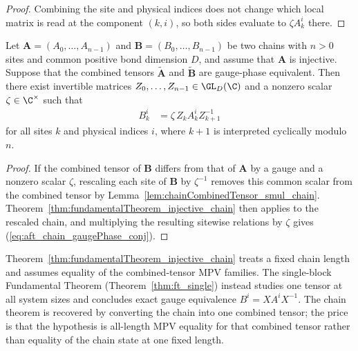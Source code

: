 \begin{proof}
    \leanok
    Combining the site and physical indices does not change which local matrix
    is read at the component $(k,i)$, so both sides evaluate to
    $\zeta A_k^i$ there.
\end{proof}

\begin{corollary}%
    \label{thm:fundamentalTheorem_injective_chain_gaugePhase}
    \leanok
    Let $\mathbf{A} = (A_0, \ldots, A_{n-1})$ and
    $\mathbf{B} = (B_0, \ldots, B_{n-1})$ be two chains with $n>0$ sites and
    common positive bond dimension $D$, and assume that $\mathbf{A}$ is
    injective.
    Suppose that the combined tensors $\widetilde{\mathbf{A}}$ and
    $\widetilde{\mathbf{B}}$ are gauge-phase equivalent.
    Then there exist invertible matrices $Z_0, \ldots, Z_{n-1} \in \GL_D(\C)$
    and a nonzero scalar $\zeta \in \C^{\times}$ such that
    \begin{align}
        B_k^i
         & =\zeta\,Z_k A_k^i Z_{k+1}^{-1}
        \label{eq:aft_chain_gaugePhase_conj}
    \end{align}
    for all sites $k$ and physical indices $i$, where $k+1$ is interpreted
    cyclically modulo $n$.
\end{corollary}

\begin{proof}
    \leanok
    If the combined tensor of $\mathbf{B}$ differs from that of $\mathbf{A}$
    by a gauge and a nonzero scalar $\zeta$, rescaling each site of
    $\mathbf{B}$ by $\zeta^{-1}$ removes this common scalar from the combined tensor by Lemma~\ref{lem:chainCombinedTensor_smul_chain}.
    Theorem~\ref{thm:fundamentalTheorem_injective_chain} then applies to the
    rescaled chain, and multiplying the resulting sitewise relations by $\zeta$
    gives (\ref{eq:aft_chain_gaugePhase_conj}).
\end{proof}

\begin{remark}
    \label{rem:ft_vs_singleBlock}
    Theorem~\ref{thm:fundamentalTheorem_injective_chain} treats a fixed chain
    length and assumes equality of the combined-tensor MPV families.
    The single-block Fundamental Theorem
    (Theorem~\ref{thm:ft_single}) instead studies one tensor at all system
    sizes and concludes exact gauge equivalence
    $B^i = X A^i X^{-1}$.
    The chain theorem is recovered by converting the chain into one combined
    tensor; the price is that the hypothesis is all-length MPV equality for
    that combined tensor rather than equality of the chain state at one fixed
    length.
\end{remark}


